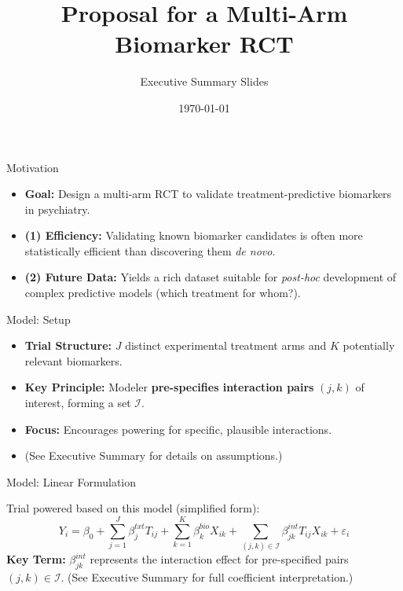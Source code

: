 \documentclass{beamer}
\title{Proposal for a Multi-Arm Biomarker RCT}
\subtitle{Executive Summary Slides}
\author{}
\date{\today}
\begin{document}
\begin{frame}
  \titlepage %
\end{frame}

\begin{frame}{Motivation}
  \begin{itemize}
    \item \textbf{Goal:} Design a multi-arm RCT to validate treatment-predictive biomarkers in psychiatry. \pause
    \item \textbf{(1) Efficiency:} Validating known biomarker candidates is often more statistically efficient than discovering them \emph{de novo}. \pause
    \item \textbf{(2) Future Data:} Yields a rich dataset suitable for \emph{post-hoc} development of complex predictive models (which treatment for whom?).
  \end{itemize}
\end{frame}

\begin{frame}{Model: Setup}
  \begin{itemize}
    \item \textbf{Trial Structure:} $J$ distinct experimental treatment arms and $K$ potentially relevant biomarkers. \pause
    \item \textbf{Key Principle:} Modeler \textbf{pre-specifies interaction pairs} $ (j, k) $ of interest, forming a set $\mathcal{I}$. \pause
    \item \textbf{Focus:} Encourages powering for specific, plausible interactions. \pause
    \item (See Executive Summary for details on assumptions.)
  \end{itemize}
\end{frame}

\begin{frame}{Model: Linear Formulation}
  
  Trial powered based on this model (simplified form): 
  \pause
  \vspace{1em} %
  $$ %
  Y_i = \beta_0 + \sum_{j=1}^J \beta^{txt}_j T_{ij} + \sum_{k=1}^K \beta^{bio}_k X_{ik} + \sum_{(j,k) \in \mathcal{I}} \beta^{int}_{jk} T_{ij} X_{ik} + \varepsilon_i 
  $$ %
  \pause
  \vspace{1em} %
  \textbf{Key Term:} $ \beta^{int}_{jk} $ represents the interaction effect for pre-specified pairs $ (j,k) \in \mathcal{I} $. %
  \pause
  \vfill %
  (See Executive Summary for full coefficient interpretation.)
  
\end{frame}
\end{document}
